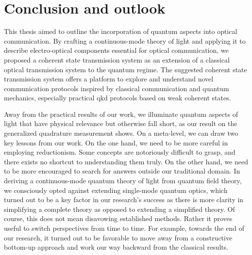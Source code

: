 \chapter*{Conclusion and outlook}

This thesis aimed to outline the incorporation of quantum aspects into optical communication.
By crafting a continuous-mode theory of light and applying it to describe electro-optical components essential for optical communication, we proposed a coherent state transmission system as an extension of a classical optical transmission system to the quantum regime.
The suggested coherent state transmission system offers a platform to explore and understand novel communication protocols inspired by classical communication and quantum mechanics, especially practical \gls{qkd} protocols based on weak coherent states.

Away from the practical results of our work, we illuminate quantum aspects of light that have physical relevance but otherwise fall short, as our result on the generalized quadrature measurement shows.
On a meta-level, we can draw two key lessons from our work.
On the one hand, we need to be more careful in employing reductionism.
Some concepts are notoriously difficult to grasp, and there exists no shortcut to understanding them truly.
On the other hand, we need to be more encouraged to search for answers outside our traditional domain.
In deriving a continuous-mode quantum theory of light from quantum field theory, we consciously opted against extending single-mode quantum optics, which turned out to be a key factor in our research's success as there is more clarity in simplifying a complete theory as opposed to extending a simplified theory.
Of course, this does not mean disavowing established methods.
Rather it proves useful to switch perspectives from time to time.
For example, towards the end of our research, it turned out to be favorable to move away from a constructive bottom-up approach and work our way backward from the classical results.

